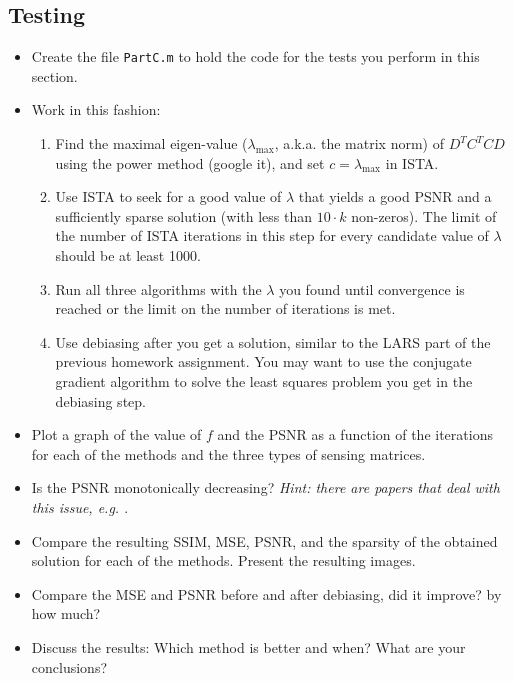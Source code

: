 \documentclass[]{article}
\newcommand{\code}{\item[\faKeyboardO]}
\newcommand{\quest}{\item[\faPencil]}
\begin{document}
\subsection{Testing}
\begin{itemize}
	\code Create the file \lstinline|PartC.m| to hold the code for the tests you perform in this section.
	\item Work in this fashion: 
	\begin{enumerate}
		\item Find the maximal eigen-value ($\lambda_{\max}$, a.k.a. the matrix norm) of $D^TC^TCD$ using the power method (google it), and set $c = \lambda_{\max}$ in ISTA.
		\item Use ISTA to seek for a good value of $\lambda$ that yields a good PSNR and a sufficiently sparse solution (with less than $10\cdot k$ non-zeros). The limit of the number of ISTA iterations in this step for every candidate value of $\lambda$ should be at least 1000. 
		\item Run all three algorithms with the $\lambda$ you found until convergence is reached or the limit on the number of iterations is met.  
		\item Use debiasing after you get a solution, similar to the LARS part of the previous homework assignment. You may want to use the conjugate gradient algorithm to solve the least squares problem you get in the debiasing step.    
	\end{enumerate} 
	\item Plot a graph of the value of $f$ and the PSNR as a function of the iterations for each of the methods and the three types of sensing matrices. 
	\quest Is the PSNR monotonically decreasing? \emph{Hint: there are papers that deal with this issue, e.g. \cite{giryes2011projected}}. 
	\code Compare the resulting SSIM, MSE, PSNR, and the sparsity of the obtained solution for each of the methods. Present the resulting images. 
	\quest Compare the MSE and PSNR before and after debiasing, did it improve? by how much?   
	\quest Discuss the results: Which method is better and when? What are your conclusions? 
\end{itemize}
\end{document}
